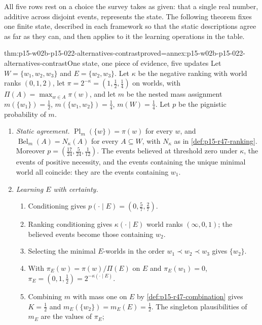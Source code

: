 All five rows rest on a choice the survey takes as given: that a single
real number, additive across disjoint events, represents the state. The
following theorem fixes one finite state, described in each framework so
that the static descriptions agree as far as they can, and then applies to
it the learning operations in the table.

\begin{hbtheorem}{thm:p15-w02b-p15-022-alternatives-contrast}{proved=annex:p15-w02b-p15-022-alternatives-contrast}{One state, one piece of evidence, five updates}
Let \(W=\{w_1,w_2,w_3\}\) and \(E=\{w_2,w_3\}\). Let \(\kappa\) be the
negative ranking with world ranks \((0,1,2)\), let
\(\pi=2^{-\kappa}=(1,\tfrac12,\tfrac14)\) on worlds, with
\(\Pi(A)=\max_{w\in A}\pi(w)\), and let \(m\) be the nested mass
assignment \(m(\{w_1\})=\tfrac12\), \(m(\{w_1,w_2\})=\tfrac14\),
\(m(W)=\tfrac14\). Let \(p\) be the pignistic probability of \(m\).
\begin{enumerate}
\item \emph{Static agreement.} \(\operatorname{Pl}_m(\{w\})=\pi(w)\) for
      every \(w\), and \(\operatorname{Bel}_m(A)=N_\kappa(A)\) for every
      \(A\subseteq W\), with \(N_\kappa\) as in \cref{def:p15-r47-ranking}.
      Moreover \(p=(\tfrac{17}{24},\tfrac5{24},\tfrac1{12})\). The events
      believed at threshold zero under \(\kappa\), the events of positive
      necessity, and the events containing the unique minimal world all
      coincide: they are the events containing \(w_1\).
\item \emph{Learning \(E\) with certainty.}
      \begin{enumerate}
      \item Conditioning gives \(p(\cdot\mid E)=(0,\tfrac57,\tfrac27)\).
      \item Ranking conditioning gives \(\kappa(\cdot\mid E)\) world ranks
            \((\infty,0,1)\); the believed events become those containing
            \(w_2\).
      \item Selecting the minimal \(E\)-worlds in the order
            \(w_1\prec w_2\prec w_3\) gives \(\{w_2\}\).
      \item With \(\pi_E(w)=\pi(w)/\Pi(E)\) on \(E\) and \(\pi_E(w_1)=0\),
            \(\pi_E=(0,1,\tfrac12)=2^{-\kappa(\cdot\mid E)}\).
      \item Combining \(m\) with mass one on \(E\) by
            \cref{def:p15-r47-combination} gives \(K=\tfrac12\) and
            \(m_E(\{w_2\})=m_E(E)=\tfrac12\). The singleton
            plausibilities of \(m_E\) are the values of \(\pi_E\);

\end{enumerate}
\end{enumerate}
\end{hbtheorem}
